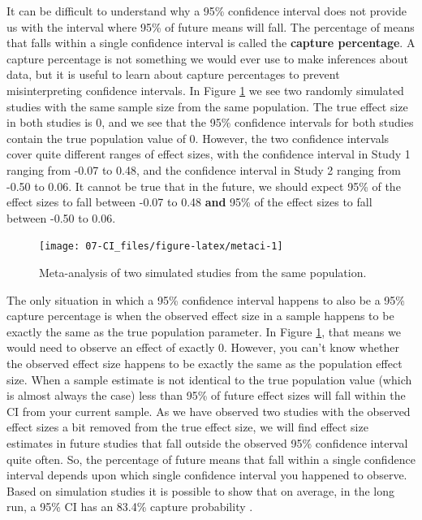 \documentclass[
  oneside]{krantz}
\begin{document}
It can be difficult to understand why a 95\% confidence interval does not provide us with the interval where 95\% of future means will fall. The percentage of means that falls within a single confidence interval is called the \textbf{capture percentage}. A capture percentage is not something we would ever use to make inferences about data, but it is useful to learn about capture percentages to prevent misinterpreting confidence intervals. In Figure \ref{fig:metaci} we see two randomly simulated studies with the same sample size from the same population. The true effect size in both studies is 0, and we see that the 95\% confidence intervals for both studies contain the true population value of 0. However, the two confidence intervals cover quite different ranges of effect sizes, with the confidence interval in Study 1 ranging from -0.07 to 0.48, and the confidence interval in Study 2 ranging from -0.50 to 0.06. It cannot be true that in the future, we should expect 95\% of the effect sizes to fall between -0.07 to 0.48 \textbf{and} 95\% of the effect sizes to fall between -0.50 to 0.06.



\begin{figure}

{\centering \texttt{[image: 07-CI\_files/figure-latex/metaci-1]} 

}

\caption{Meta-analysis of two simulated studies from the same population.}\label{fig:metaci}
\end{figure}

The only situation in which a 95\% confidence interval happens to also be a 95\% capture percentage is when the observed effect size in a sample happens to be exactly the same as the true population parameter. In Figure \ref{fig:metaci}, that means we would need to observe an effect of exactly 0. However, you can't know whether the observed effect size happens to be exactly the same as the population effect size. When a sample estimate is not identical to the true population value (which is almost always the case) less than 95\% of future effect sizes will fall within the CI from your current sample. As we have observed two studies with the observed effect sizes a bit removed from the true effect size, we will find effect size estimates in future studies that fall outside the observed 95\% confidence interval quite often. So, the percentage of future means that fall within a single confidence interval depends upon which single confidence interval you happened to observe. Based on simulation studies it is possible to show that on average, in the long run, a 95\% CI has an 83.4\% capture probability \citep{cumming_confidence_2006}.
\end{document}
